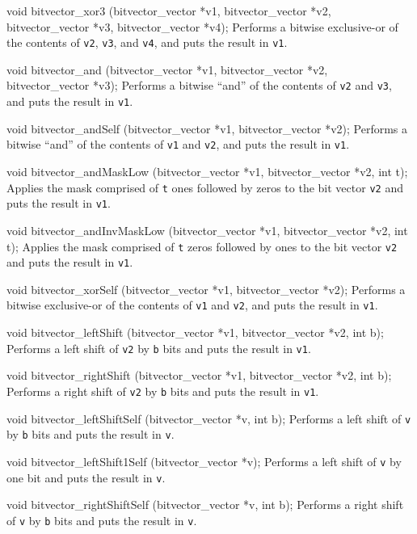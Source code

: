 void bitvector_xor3 (bitvector_vector *v1, bitvector_vector *v2, 
                     bitvector_vector *v3, bitvector_vector *v4);
\endcode
 \tab
Performs a bitwise exclusive-or of the contents of \texttt{v2}, \texttt{v3}, and \texttt{v4},
and puts the result in \texttt{v1}.
 \endtab
\code

void bitvector_and (bitvector_vector *v1, bitvector_vector *v2, bitvector_vector *v3);
\endcode
 \tab
Performs a bitwise ``and'' of the contents of \texttt{v2} and \texttt{v3},
and puts the result in \texttt{v1}.
 \endtab
\code

void bitvector_andSelf (bitvector_vector *v1, bitvector_vector *v2);
\endcode
 \tab
Performs a bitwise ``and'' of the contents of \texttt{v1} and \texttt{v2},
and puts the result in \texttt{v1}.
 \endtab
\code

void bitvector_andMaskLow (bitvector_vector *v1, bitvector_vector *v2, int t);
\endcode
 \tab
Applies the mask comprised of {\tt t} ones followed by zeros to the bit vector 
{\tt v2} and puts the result in {\tt v1}.
\endtab
\code

void bitvector_andInvMaskLow (bitvector_vector *v1, bitvector_vector *v2, int t);
\endcode
 \tab
Applies the mask comprised of {\tt t} zeros followed by ones to the bit vector 
{\tt v2} and puts the result in {\tt v1}.
 \endtab
\code

void bitvector_xorSelf (bitvector_vector *v1, bitvector_vector *v2);
\endcode
 \tab
Performs a bitwise exclusive-or of the contents of \texttt{v1} and \texttt{v2}, 
and puts the result in \texttt{v1}.
 \endtab
\code

void bitvector_leftShift (bitvector_vector *v1, bitvector_vector *v2, int b);    
\endcode
 \tab
Performs a left shift of \texttt{v2} by \texttt{b} bits 
and puts the result in \texttt{v1}.
 \endtab
\code

void bitvector_rightShift (bitvector_vector *v1, bitvector_vector *v2, int b);
\endcode
 \tab
Performs a right shift of \texttt{v2} by \texttt{b} bits 
and puts the result in \texttt{v1}.
 \endtab
\code

void bitvector_leftShiftSelf (bitvector_vector *v, int b);
\endcode
 \tab
Performs a left shift of \texttt{v} by \texttt{b} bits 
and puts the result in \texttt{v}.
 \endtab
\code

void bitvector_leftShift1Self (bitvector_vector *v);
\endcode
 \tab
Performs a left shift of \texttt{v} by one bit
and puts the result in \texttt{v}.
 \endtab
\code

void bitvector_rightShiftSelf (bitvector_vector *v, int b);
\endcode
 \tab
Performs a right shift of \texttt{v} by \texttt{b} bits 
and puts the result in \texttt{v}.
 \endtab
\code

